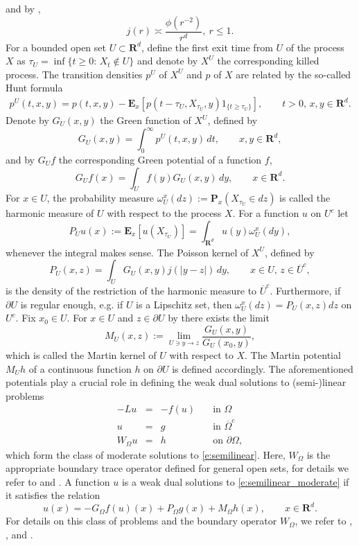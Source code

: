 \documentclass[a4paper,12pt,draft]{article}
\theoremstyle{plain}
\theoremstyle{definition}
\numberwithin{equation}{section}
\newcommand\R{\mathbf{R}}
\newcommand\E{\mathbf{E}}
\newcommand\Pp{\mathbf{P}}
\renewcommand{\leq}{\leqslant}
\renewcommand{\ge}{\geqslant}
\newcommand{\1}{1}
\begin{document}
and by \cite[Theorem 2.3]{ubHp},
\begin{equation}\label{eq:j}
j(r)\asymp \frac{\phi(r^{-2})}{r^d},\ r\leq 1.
\end{equation}
For a bounded open set $U\subset \R^d$, define the first exit time from $U$ of the process $X$ as $\tau_U=\inf\{t\ge 0:\, X_t\not\in U\}$ and denote by $X^U$ the corresponding killed process. The transition densities $p^U$ of $X^U$ and $p$ of $X$ are related by the so-called Hunt formula
\begin{align*}\label{eq:p_D Hunt}
		p^U(t,x,y)=p(t,x,y)-\E_x[p(t-\tau_U,X_{\tau_U},y)\1_{\{t\ge\tau_U\}}], \qquad t>0, \, x,y\in\R^d.
	\end{align*}
Denote by $G_U(x,y)$ the Green function of $X^U$, defined by
\[
G_U(x,y)=\int_0^\infty p^U(t,x,y)\, dt, \qquad x,y\in\R^d,
\]
and by $G_Uf$ the corresponding Green potential of a function $f$,
\[
G_Uf(x)=\int_U f(y)G_U(x,y)\, dy,\qquad x\in\R^d.
\]
For $x \in U$, the probability measure $\omega^x_U(dz) := \Pp_x(X_{\tau_U}\in dz)$ is called the harmonic measure of $U$ with respect to the process $X$. For a function $u$ on $U^c$ let 
\begin{equation}\label{eq:harmonic_potential}
P_Uu(x) := \E_x[u(X_{\tau_U})] =\int_{\R^d}u(y)\omega^x_U(dy),    
\end{equation}
whenever the integral makes sense. The Poisson kernel of $X^U$, defined by
\[
P_U(x,z)=\int_U G_U(x,y)j(|y-z|)\, dy,\qquad x\in U,\, z\in \overline{U}^c,
\]
is the density of the restriction of the harmonic measure to $\overline{U}^c$. Furthermore, if $\partial U$ is regular enough, e.g. if $U$ is a Lipschitz set, then
$\omega_U^x(dz)=P_U(x,z)dz$ on ${U}^c$.
Fix $x_0\in U$. For $x\in U$ and $z\in\partial U$ by \cite[
Lemma 3.4, Theorem 1.1]{KSV18a} there exists the limit
\[
M_U(x, z) := \lim_{U\ni y\to z}\frac{G_U(x,y)}{G_U(x_0,y)},
\]
which is called the Martin kernel of $U$ with respect to $X$. The Martin potential $M_Uh$ of a continuous function $h$ on $\partial U$ is defined accordingly. The aforementioned potentials play a crucial role in defining the weak dual solutions to (semi-)linear problems
\begin{equation}\label{e:semilinear_moderate}
	\begin{array}{rcll}
		-Lu&=& -f(u)& \quad \text{in } \Omega\\
		u&=&g& \quad \text{in }\overline{\Omega}^c\\
		W_\Omega u&=&h&\quad \text{on }\partial \Omega,
	\end{array}
\end{equation}
which form the class of moderate solutions to \eqref{e:semilinear}. Here, $W_\Omega$ is the appropriate boundary trace operator defined for general open sets, for details we refer to \cite{BVW} and \cite{Bio}. A function $u$ is a weak dual solutions to \eqref{e:semilinear_moderate} if it satisfies the relation
\[
u(x)=-G_\Omega f(u)(x)+P_\Omega g(x)+M_\Omega h(x), \qquad x\in\R^d.
\]
For details on this class of problems and the boundary operator $W_\Omega$, we refer to \cite{BJK}, \cite{Bio}, and \cite{BVW}.
\end{document}
